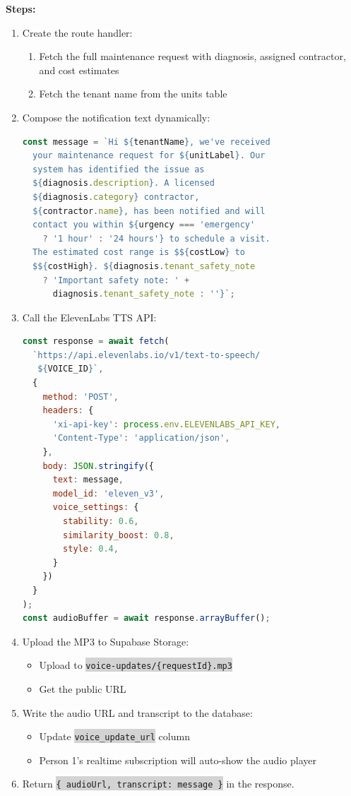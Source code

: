 \documentclass[11pt, a4paper]{article}
\newcommand{\code}[1]{\texttt{\small\colorbox{lightgray}{#1}}}
\begin{document}
\textbf{Steps:}
\begin{enumerate}[leftmargin=2em, itemsep=2pt]
  \item Create the route handler:
    \begin{enumerate}[itemsep=1pt]
      \item Fetch the full maintenance request with diagnosis, assigned contractor, and cost estimates
      \item Fetch the tenant name from the units table
    \end{enumerate}

  \item Compose the notification text dynamically:
\begin{lstlisting}[language=JavaScript]
const message = `Hi ${tenantName}, we've received 
  your maintenance request for ${unitLabel}. Our 
  system has identified the issue as 
  ${diagnosis.description}. A licensed 
  ${diagnosis.category} contractor, 
  ${contractor.name}, has been notified and will 
  contact you within ${urgency === 'emergency' 
    ? '1 hour' : '24 hours'} to schedule a visit. 
  The estimated cost range is $${costLow} to 
  $${costHigh}. ${diagnosis.tenant_safety_note 
    ? 'Important safety note: ' + 
      diagnosis.tenant_safety_note : ''}`;
\end{lstlisting}

  \item Call the ElevenLabs TTS API:
\begin{lstlisting}[language=JavaScript]
const response = await fetch(
  `https://api.elevenlabs.io/v1/text-to-speech/
   ${VOICE_ID}`,
  {
    method: 'POST',
    headers: {
      'xi-api-key': process.env.ELEVENLABS_API_KEY,
      'Content-Type': 'application/json',
    },
    body: JSON.stringify({
      text: message,
      model_id: 'eleven_v3',
      voice_settings: {
        stability: 0.6,
        similarity_boost: 0.8,
        style: 0.4,
      }
    })
  }
);
const audioBuffer = await response.arrayBuffer();
\end{lstlisting}

  \item Upload the MP3 to Supabase Storage:
    \begin{itemize}[itemsep=1pt]
      \item Upload to \code{voice-updates/\{requestId\}.mp3}
      \item Get the public URL
    \end{itemize}

  \item Write the audio URL and transcript to the database:
    \begin{itemize}[itemsep=1pt]
      \item Update \code{voice\_update\_url} column
      \item Person 1's realtime subscription will auto-show the audio player
    \end{itemize}

  \item Return \code{\{ audioUrl, transcript: message \}} in the response.
\end{enumerate}
\end{document}
